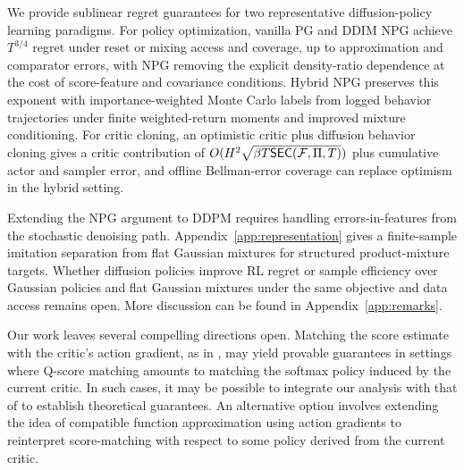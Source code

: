 We provide sublinear regret guarantees for two representative diffusion-policy learning paradigms.
For policy optimization, vanilla PG and DDIM NPG achieve $T^{3/4}$ regret under reset or mixing access and coverage, up to approximation and comparator errors, with
NPG removing the explicit density-ratio dependence at the cost of score-feature and covariance conditions. Hybrid NPG preserves this exponent with importance-weighted Monte Carlo labels from logged behavior trajectories under finite weighted-return moments and improved mixture conditioning.
For critic cloning, an optimistic critic plus diffusion behavior cloning gives a critic contribution of $O(H^2\sqrt{\beta T\mathsf{SEC}({\mathcal{F}},\Pi,T)})$ plus cumulative actor and sampler error, and offline Bellman-error coverage can replace optimism in the hybrid setting.


Extending the NPG argument to DDPM requires handling errors-in-features from the stochastic denoising path.
Appendix~\ref{app:representation} gives a finite-sample imitation separation from flat Gaussian mixtures for structured product-mixture targets. Whether diffusion policies improve RL regret or sample efficiency over Gaussian policies and flat Gaussian mixtures under the same objective and data access remains open.
More discussion can be found in Appendix~\ref{app:remarks}.

Our work leaves several compelling directions open. Matching  the score estimate with the critic’s action gradient, as in \cite{psenka2024learningdiffusionmodelpolicy}, may yield provable guarantees in settings where Q-score matching amounts to matching the softmax policy induced by the current critic. In such cases, it may be possible to integrate our analysis with that of \cite{tan2025actor} to establish theoretical guarantees. 
An alternative option involves extending the idea of compatible function approximation \citep{sutton1999policygradient} using action gradients to reinterpret score-matching with respect to some policy derived from the current critic. 

% 